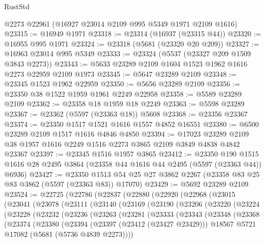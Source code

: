 \begin{lexlean}{RustStd}
\begin{coremodule}
    @2273
    @22961
    (@16927 @23014 @2109 @995 @5349 @1971 @2109 @1616)
@23315 := @16949 @1971
@23318 := @23314 (@16937 (@23315 @44))
@23320 := @16955 @995 @1971
@23324 := @23318 (@5681 (@23320 @20 @209))
@23327 := @16963 @23014 @995 @5349
@23333 := @23324 (@5537 (@23327 @209 @1509 @3843 @2273))
@23343 := @5633 @23289 @2109 @1604 @1523 @1962 @1616 @2273 @22959 @2109 @1973
@23345 := @5647 @23289 @2109
@23348 := @23345 @1523 @1962 @22959
@23350 := @5656 @23289 @2109
@23356 := @23350 @38 @1522 @1959 @1961 @2249 @22958
@23358 := @5589 @23289 @2109
@23362 := @23358 @18 @1959 @18 @2249
@23363 := @5598 @23289
@23367 := @23362 (@5597 (@23363 @18)) @5608
@23368 := @23356 @23367
@23374 := @23350 @1517 @1521 @1616 @1557 @4852 @16551
@23380 := @6500 @23289 @2109 @1517 @1616 @4846 @4850
@23394 := @17023 @23289 @2109 @38 @1957 @1616 @2249 @1516 @2273 @3865 @2109 @3849 @4838 @4842 @23367
@23397 := @23345 @1516 @1957 @3865
@23412 := @23350
    @190
    @1515
    @1616
    @28
    @2495
    @3864
    (@23358 @44 @1616 @44 @2495 (@5597 (@23363 @44)) @6936)
@23427 := @23350
    @1513
    @54
    @25
    @27
    @3862
    @2267
    (@23358 @83 @25 @83 @3862 (@5597 (@23363 @83)) @17070)
@23429 := @5692 @23289 @2109
@23524 := @22725
    (@22786
      (@22837
        (@22880
          (@22920
            (@22968
              (@23015
                (@23041
                  (@23078
                    (@23111
                      (@23140
                        (@23169
                          (@23190
                            (@23206
                              (@23220
                                (@23224
                                  (@23228
                                    (@23232
                                      (@23236
                                        (@23263
                                          (@23281
                                            (@23333
                                              (@23343
                                                (@23348
                                                  (@23368
                                                    (@23374
                                                      (@23380
                                                        (@23394
                                                          (@23397 (@23412 (@23427 @23429)))
                                                          @18567
                                                          @5721
                                                          @17082
                                                          (@5681 (@5736 @4839 @2273))))

\end{coremodule}
\end{lexlean}
